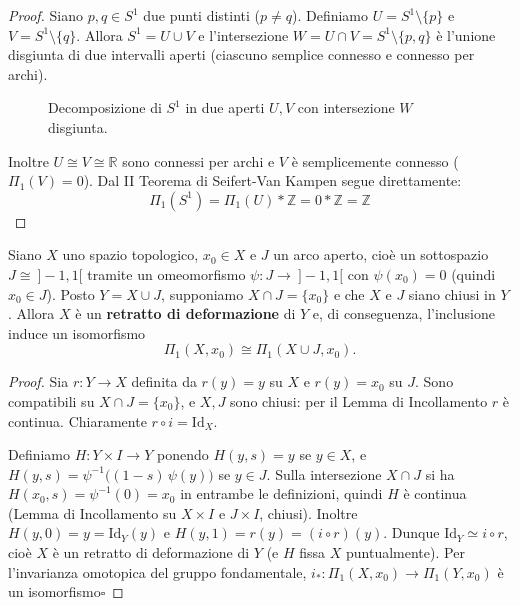 \begin{proof}
Siano $p, q \in S^1$ due punti distinti ($p \neq q$). Definiamo $U = S^1 \setminus \{p\}$ e $V = S^1 \setminus \{q\}$.
Allora $S^1 = U \cup V$ e l'intersezione $W = U \cap V = S^1 \setminus \{p, q\}$ è l'unione disgiunta di due intervalli aperti (ciascuno semplice connesso e connesso per archi).

\begin{figure}[H]
    \centering
    \caption{Decomposizione di $S^1$ in due aperti $U, V$ con intersezione $W$ disgiunta.}
\end{figure}

Inoltre $U \cong V \cong \mathbb{R}$ sono connessi per archi e $V$ \`e semplicemente connesso ($\Pi_1(V) = 0$).
Dal II Teorema di Seifert-Van Kampen segue direttamente:
\[
\Pi_1(S^1) = \Pi_1(U) * \mathbb{Z} = 0 * \mathbb{Z} = \mathbb{Z}
\]
\end{proof}

\vspace{1.5em}

\begin{lema}
Siano $X$ uno spazio topologico, $x_0 \in X$ e $J$ un arco aperto, cio\`e un sottospazio $J \cong\ ]-1,1[$ tramite un omeomorfismo $\psi: J \to\ ]-1,1[$ con $\psi(x_0) = 0$ (quindi $x_0 \in J$). Posto $Y = X \cup J$, supponiamo $X \cap J = \{x_0\}$ e che $X$ e $J$ siano chiusi in $Y$.
Allora $X$ \`e un \textbf{retratto di deformazione} di $Y$ e, di conseguenza, l'inclusione induce un isomorfismo
\[
\Pi_1(X, x_0) \cong \Pi_1(X \cup J, x_0).
\]
\end{lema}

\begin{proof}
Sia $r: Y \to X$ definita da $r(y) = y$ su $X$ e $r(y) = x_0$ su $J$. Sono compatibili su $X \cap J = \{x_0\}$, e $X, J$ sono chiusi: per il Lemma di Incollamento $r$ \`e continua. Chiaramente $r \circ i = \mathrm{Id}_X$.

Definiamo $H: Y \times I \to Y$ ponendo $H(y,s) = y$ se $y \in X$, e $H(y,s) = \psi^{-1}\big((1-s)\,\psi(y)\big)$ se $y \in J$. Sulla intersezione $X \cap J$ si ha $H(x_0, s) = \psi^{-1}(0) = x_0$ in entrambe le definizioni, quindi $H$ \`e continua (Lemma di Incollamento su $X \times I$ e $J \times I$, chiusi). Inoltre $H(y,0) = y = \mathrm{Id}_Y(y)$ e $H(y,1) = r(y) = (i\circ r)(y)$. Dunque $\mathrm{Id}_Y \simeq i \circ r$, cio\`e $X$ \`e un retratto di deformazione di $Y$ (e $H$ fissa $X$ puntualmente). Per l'invarianza omotopica del gruppo fondamentale, $i_*: \Pi_1(X,x_0) \to \Pi_1(Y,x_0)$ \`e un isomorfismo\hfill$\square$
\end{proof}

